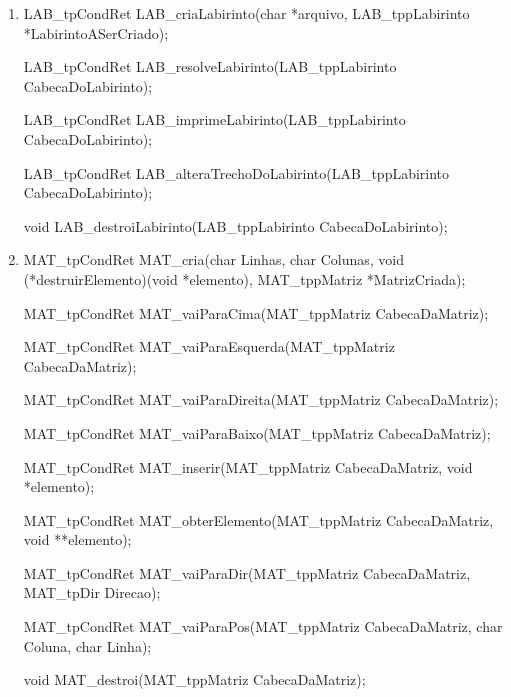 \documentclass[a4paper,12pt,oneside]{book}
\begin{document}
\begin{enumerate}\setlength{\parskip}{1\baselineskip}


    \item

          LAB\_tpCondRet LAB\_criaLabirinto(char *arquivo, LAB\_tppLabirinto *LabirintoASerCriado);

          LAB\_tpCondRet LAB\_resolveLabirinto(LAB\_tppLabirinto CabecaDoLabirinto);

          LAB\_tpCondRet LAB\_imprimeLabirinto(LAB\_tppLabirinto CabecaDoLabirinto);

          LAB\_tpCondRet LAB\_alteraTrechoDoLabirinto(LAB\_tppLabirinto CabecaDoLabirinto);

          void LAB\_destroiLabirinto(LAB\_tppLabirinto CabecaDoLabirinto);

    \item

          MAT\_tpCondRet MAT\_cria(char Linhas, char Colunas, void (*destruirElemento)(void *elemento), MAT\_tppMatriz *MatrizCriada);

          MAT\_tpCondRet MAT\_vaiParaCima(MAT\_tppMatriz CabecaDaMatriz);

          MAT\_tpCondRet MAT\_vaiParaEsquerda(MAT\_tppMatriz CabecaDaMatriz);

          MAT\_tpCondRet MAT\_vaiParaDireita(MAT\_tppMatriz CabecaDaMatriz);

          MAT\_tpCondRet MAT\_vaiParaBaixo(MAT\_tppMatriz CabecaDaMatriz);

          MAT\_tpCondRet MAT\_inserir(MAT\_tppMatriz CabecaDaMatriz, void *elemento);

          MAT\_tpCondRet MAT\_obterElemento(MAT\_tppMatriz CabecaDaMatriz, void **elemento);

          MAT\_tpCondRet MAT\_vaiParaDir(MAT\_tppMatriz CabecaDaMatriz, MAT\_tpDir Direcao);

          MAT\_tpCondRet MAT\_vaiParaPos(MAT\_tppMatriz CabecaDaMatriz, char Coluna, char Linha);

          void MAT\_destroi(MAT\_tppMatriz CabecaDaMatriz);

          \setlength{\parskip}{1pt}


\end{enumerate}

% 
% 
% 
% 
% 
% 
% 
\end{document}
